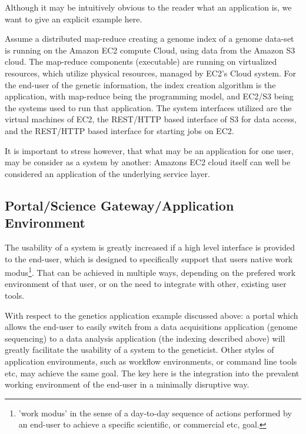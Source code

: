 \documentclass[conference,final]{IEEEtran}
\begin{document}
  Although it may be intuitively obvious to the reader what an
  application is, we want to give an explicit example here. 
 
  Assume a distributed map-reduce creating a genome index of a genome
  data-set is running on the Amazon EC2 compute Cloud, using data from
  the Amazon S3 cloud.  The map-reduce components (executable) are
  running on virtualized resources, which utilize physical resources,
  managed by EC2's Cloud system.  For the end-user of the genetic
  information, the index creation algorithm is the application, with
  map-reduce being the programming model, and EC2/S3 being the systems
  used to run that application.  The system interfaces utilized are
  the virtual machines of EC2, the REST/HTTP based interface of S3 for
  data access, and the REST/HTTP based interface for starting jobs on
  EC2.

  It is important to stress however, that what may be an application
  for one user, may be consider as a system by another: Amazons EC2
  cloud itself can well be considered an application of the underlying
  service layer.


 \subsection{Portal/Science Gateway/Application Environment}

  The usability of a system is greatly increased if a high level
  interface is provided to the end-user, which is designed to
  specifically support that users native work modus\footnote{'work
  modus' in the sense of a day-to-day sequence of actions performed by
  an end-user to achieve a specific scientific, or commercial etc,
  goal.}.  That can be achieved in multiple ways, depending on the
  prefered work environment of that user, or on the need to integrate
  with other, existing user tools.

  With respect to the genetics application example discussed above: a
  portal which allows the end-user to easily switch from a data
  acquisitions application (genome sequencing) to a data analysis
  application (the indexing described above) will greatly facilitate
  the usability of a system to the geneticist.  Other styles of
  application environments, such as workflow environments, or command
  line tools etc, may achieve the same goal.  The key here is the
  integration into the prevalent working environment of the end-user
  in a minimally disruptive way.\\
\end{document}
